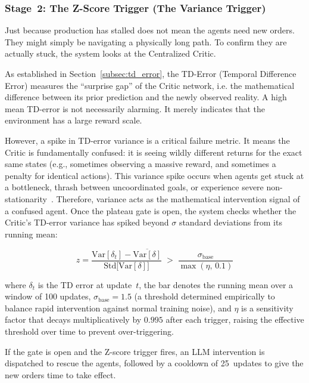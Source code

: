 \subsubsection{Stage~2: The Z-Score Trigger (The Variance Trigger)}

Just because production has stalled does not mean the agents need new orders. They might simply be navigating a physically long path. To confirm they are actually stuck, the system looks at the Centralized Critic.

As established in Section~\ref{subsec:td_error}, the TD-Error (Temporal Difference Error) measures the ``surprise gap'' of the Critic network, i.e. the mathematical difference between its prior prediction and the newly observed reality. A high mean TD-error is not necessarily alarming. It merely indicates that the environment has a large reward scale.

However, a spike in TD-error variance is a critical failure metric. It means the Critic is fundamentally confused: it is seeing wildly different returns for the exact same states (e.g., sometimes observing a massive reward, and sometimes a penalty for identical actions). This variance spike occurs when agents get stuck at a bottleneck, thrash between uncoordinated goals, or experience severe non-stationarity~\parencite{Foerster_Nardelli_Farquhar_Afouras_Torr_Kohli_Whiteson_2017}. Therefore, variance acts as the mathematical intervention signal of a confused agent. Once the plateau gate is open, the system checks whether the Critic's TD-error variance has spiked beyond $\sigma$ standard deviations from its running mean:

\begin{equation}
\label{eq:zscore_trigger}
    z = \frac{
        \text{Var}[\delta_t] - \overline{\text{Var}[\delta]}
    }{
        \text{Std}\bigl[\text{Var}[\delta]\bigr]
    }
    \;>\;
    \frac{\sigma_{\text{base}}}{\max(\eta,\, 0.1)}
\end{equation}

where $\delta_t$ is the TD error at update~$t$, the bar denotes the running mean over a window of 100 updates, $\sigma_{\text{base}}=1.5$ (a threshold determined empirically to balance rapid intervention against normal training noise), and $\eta$ is a sensitivity factor that decays multiplicatively by $0.995$ after each trigger, raising the effective threshold over time to prevent over-triggering.

If the gate is open and the Z-score trigger fires, an LLM intervention is dispatched to rescue the agents, followed by a cooldown of 25~updates to give the new orders time to take effect.

